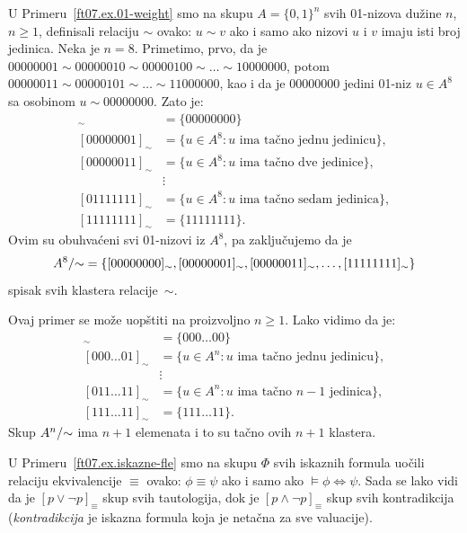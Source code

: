 \begin{EX}
  U Primeru~\ref{ft07.ex.01-weight} smo na skupu $A = \{0,1\}^n$ svih 01-nizova du\v zine $n$, $n \ge 1$,
  definisali relaciju $\sim$ ovako: $u \sim v$ ako i samo ako nizovi $u$ i $v$ imaju isti broj jedinica.
  Neka je $n = 8$. Primetimo, prvo, da je $00000001 \sim 00000010 \sim 00000100 \sim \ldots \sim 10000000$,
  potom $00000011 \sim 00000101 \sim \ldots \sim 11000000$, kao i da je $00000000$ jedini 01-niz $u \in A^8$
  sa osobinom $u \sim 00000000$. Zato je:
  \begin{align*}
    [00000000]_\sim &= \{00000000\}\\
    [00000001]_\sim &= \{ u \in A^8 : u \text{ ima ta\v cno jednu jedinicu} \},\\
    [00000011]_\sim &= \{ u \in A^8 : u \text{ ima ta\v cno dve jedinice} \},\\
                    &\vdots\\
    [01111111]_\sim &= \{ u \in A^8 : u \text{ ima ta\v cno sedam jedinica} \},\\
    [11111111]_\sim &= \{ 11111111 \}.
  \end{align*}
  Ovim su obuhva\'ceni svi 01-nizovi iz $A^8$, pa zaklju\v cujemo da je
  $$
    A^8 / \mbox{$\sim$} = \{[00000000]_\sim, [00000001]_\sim, [00000011]_\sim, \ldots, [11111111]_\sim\}
  $$
  spisak svih klastera relacije~$\sim$.

  Ovaj primer se mo\v ze uop\v stiti na proizvoljno $n \ge 1$. Lako vidimo da je:
  \begin{align*}
    [000\ldots00]_\sim &= \{000\ldots00\}\\
    [000\ldots01]_\sim &= \{ u \in A^n : u \text{ ima ta\v cno jednu jedinicu} \},\\
                    &\vdots\\
    [011\ldots11]_\sim &= \{ u \in A^n : u \text{ ima ta\v cno $n-1$ jedinica} \},\\
    [111\ldots11]_\sim &= \{ 111\ldots11 \}.
  \end{align*}
  Skup $A^n / \mbox{$\sim$}$ ima $n + 1$ elemenata i to su ta\v cno ovih $n + 1$ klastera.
\end{EX}

\begin{EX}
  U Primeru~\ref{ft07.ex.iskazne-fle} smo na skupu $\Phi$ svih iskaznih formula uo\v cili relaciju
  ekvivalencije $\equiv$ ovako: $\phi \equiv \psi$ ako i samo ako $\vDash \phi \Leftrightarrow \psi$.
  Sada se lako vidi da je \hbox{$[p \lor \lnot p]_\equiv$} skup svih tautologija, dok je
  \hbox{$[p \land \lnot p]_\equiv$} skup svih kontradikcija (\emph{kontradikcija} je iskazna formula koja je neta\v cna
  za sve valuacije).
\end{EX}

